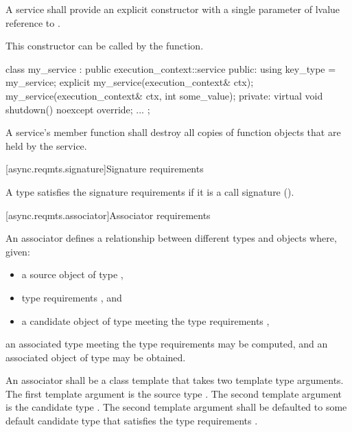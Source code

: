 \pnum
A service shall provide an explicit constructor with a single parameter of lvalue reference to . \begin{note} This constructor can be called by the  function. \end{note}

\pnum
\begin{example}

\begin{codeblock}
class my_service : public execution_context::service
{
public:
  using key_type = my_service;
  explicit my_service(execution_context& ctx);
  my_service(execution_context& ctx, int some_value);
private:
  virtual void shutdown() noexcept override;
  ...
};
\end{codeblock}

\end{example}

\pnum
A service's  member function shall destroy all copies of function objects that are held by the service.



[async.reqmts.signature]{Signature requirements}

%
%
\pnum
A type satisfies the signature requirements if it is a call signature ().



[async.reqmts.associator]{Associator requirements}

%
%
\pnum
An associator defines a relationship between different types and objects where, given:

\begin{itemize}
\item
a source object  of type ,

\item
type requirements , and

\item
a candidate object  of type  meeting the type requirements ,
\end{itemize}

an associated type  meeting the type requirements  may be computed, and an associated object  of type  may be obtained.

\pnum
An associator shall be a class template that takes two template type arguments. The first template argument is the source type . The second template argument is the candidate type . The second template argument shall be defaulted to some default candidate type  that satisfies the type requirements .


